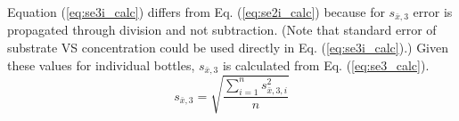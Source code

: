 \documentclass[]{article}
\begin{document}
Equation (\ref{eq:se3i_calc}) differs from Eq. (\ref{eq:se2i_calc}) because for $s_{\bar{x},3}$ error is propagated through division and not subtraction. 
(Note that standard error of substrate VS concentration could be used directly in Eq. (\ref{eq:se3i_calc}).) 
Given these values for individual bottles, $s_{\bar{x},3}$ is calculated from Eq. (\ref{eq:se3_calc}).
\begin{equation}
  \label{eq:se3_calc}
  s_{\bar{x},3} = \sqrt{\frac{\sum_{i=1} ^n s_{\bar{x},3,i}^2} {n}}
\end{equation}
\end{document}
